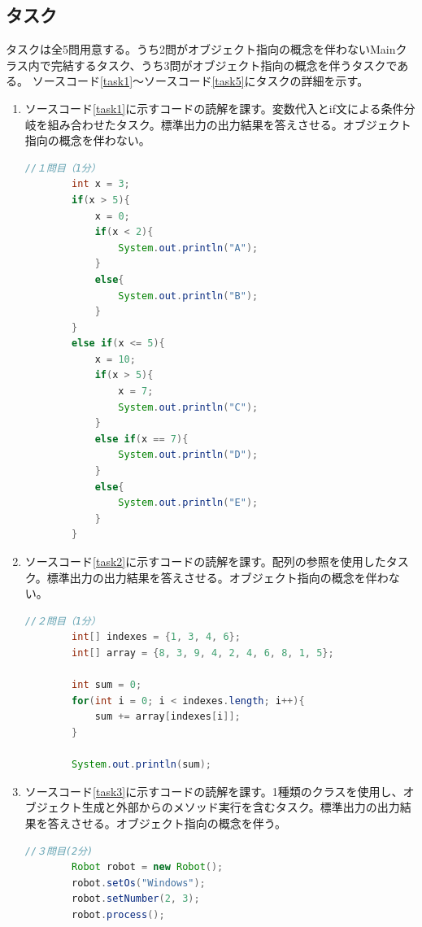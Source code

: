 \documentclass[paper=a4paper,fontsize=11pt]{jlreq}
\begin{document}
  \subsection{タスク}
    タスクは全5問用意する。うち2問がオブジェクト指向の概念を伴わないMainクラス内で完結するタスク、うち3問がオブジェクト指向の概念を伴うタスクである。
    ソースコード\ref{task1}～ソースコード\ref{task5}にタスクの詳細を示す。\\
    \begin{enumerate}[label=タスク\arabic*:]
      \item ソースコード\ref{task1}に示すコードの読解を課す。変数代入とif文による条件分岐を組み合わせたタスク。標準出力の出力結果を答えさせる。オブジェクト指向の概念を伴わない。
      \begin{lstlisting}[language=Java, caption=タスク1のソースコード, label=task1]
        //１問目（1分）
        int x = 3;
        if(x > 5){
            x = 0;
            if(x < 2){
                System.out.println("A");
            }
            else{
                System.out.println("B");
            }
        }
        else if(x <= 5){
            x = 10;
            if(x > 5){
                x = 7;
                System.out.println("C");
            }
            else if(x == 7){
                System.out.println("D");
            }
            else{
                System.out.println("E");
            }
        }
      \end{lstlisting}
      \pagebreak

      \item ソースコード\ref{task2}に示すコードの読解を課す。配列の参照を使用したタスク。標準出力の出力結果を答えさせる。オブジェクト指向の概念を伴わない。
      \begin{lstlisting}[language=Java, caption=タスク2のソースコード, label=task2]
        //２問目（1分）
        int[] indexes = {1, 3, 4, 6};
        int[] array = {8, 3, 9, 4, 2, 4, 6, 8, 1, 5};

        int sum = 0;
        for(int i = 0; i < indexes.length; i++){
            sum += array[indexes[i]];
        }

        System.out.println(sum);
      \end{lstlisting}

      \item ソースコード\ref{task3}に示すコードの読解を課す。1種類のクラスを使用し、オブジェクト生成と外部からのメソッド実行を含むタスク。標準出力の出力結果を答えさせる。オブジェクト指向の概念を伴う。
      \begin{lstlisting}[language=Java,caption=タスク3のソースコード, label=task3]
        //３問目(2分)
        Robot robot = new Robot();
        robot.setOs("Windows");
        robot.setNumber(2, 3);
        robot.process();
      \end{lstlisting}


\end{enumerate}
\end{document}
